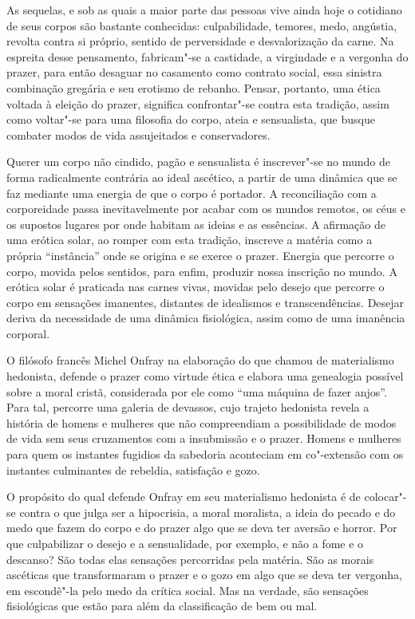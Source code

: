 As sequelas, e sob as quais a maior parte das pessoas vive ainda hoje o
cotidiano de seus corpos são bastante conhecidas: culpabilidade,
temores, medo, angústia, revolta contra si próprio, sentido de
perversidade e desvalorização da carne. Na espreita desse pensamento,
fabricam"-se a castidade, a virgindade e a vergonha do prazer, para então
desaguar no casamento como contrato social, essa sinistra combinação
gregária e seu erotismo de rebanho. Pensar, portanto, uma ética voltada
à eleição do prazer, significa confrontar"-se contra esta tradição, assim
como voltar"-se para uma filosofia do corpo, ateia e sensualista, que
busque combater modos de vida assujeitados e conservadores.

Querer um corpo não cindido, pagão e sensualista é inscrever"-se no mundo
de forma radicalmente contrária ao ideal ascético, a partir de uma
dinâmica que se faz mediante uma energia de que o corpo é portador. A
reconciliação com a corporeidade passa inevitavelmente por acabar com os
mundos remotos, os céus e os supostos lugares por onde habitam as ideias
e as essências. A afirmação de uma erótica solar, ao romper com esta
tradição, inscreve a matéria como a própria ``instância'' onde se
origina e se exerce o prazer. Energia que percorre o corpo, movida pelos
sentidos, para enfim, produzir nossa inscrição no mundo. A erótica solar
é praticada nas carnes vivas, movidas pelo desejo que percorre o corpo
em sensações imanentes, distantes de idealismos e transcendências.
Desejar deriva da necessidade de uma dinâmica fisiológica, assim como de
uma imanência corporal.

O filósofo francês Michel Onfray na elaboração do que chamou de
materialismo hedonista, defende o prazer como virtude ética e elabora
uma genealogia possível sobre a moral cristã, considerada por ele como
``uma máquina de fazer anjos''. Para tal, percorre uma galeria de
devassos, cujo trajeto hedonista revela a história de homens e mulheres
que não compreendiam a possibilidade de modos de vida sem seus
cruzamentos com a insubmissão e o prazer. Homens e mulheres para quem os
instantes fugidios da sabedoria aconteciam em co"-extensão com os
instantes culminantes de rebeldia, satisfação e gozo.

O propósito do qual defende Onfray em seu materialismo hedonista é de
colocar"-se contra o que julga ser a hipocrisia, a moral moralista, a
ideia do pecado e do medo que fazem do corpo e do prazer algo que se
deva ter aversão e horror. Por que culpabilizar o desejo e a
sensualidade, por exemplo, e não a fome e o descanso? São todas elas
sensações percorridas pela matéria. São as morais ascéticas que
transformaram o prazer e o gozo em algo que se deva ter vergonha, em
escondê"-la pelo medo da crítica social. Mas na verdade, são sensações
fisiológicas que estão para além da classificação de bem ou mal.


